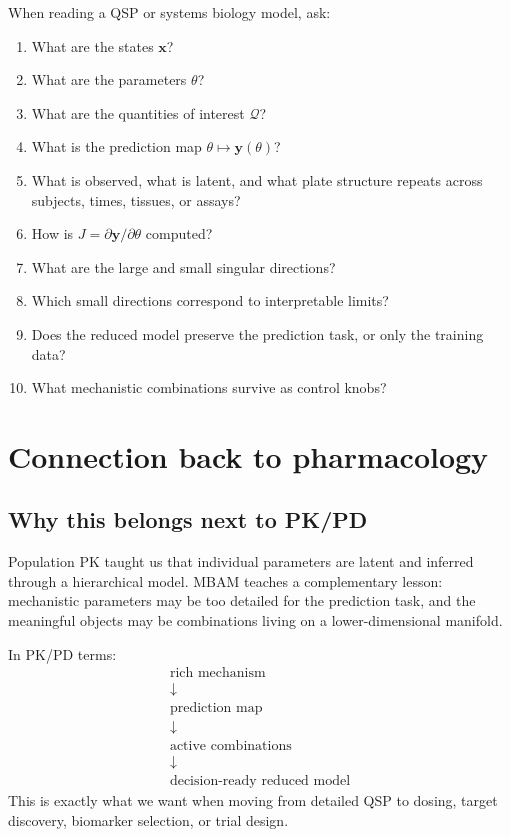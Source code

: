 \documentclass[a4paper]{article}
\newcommand{\vect}[1]{\mathbf{#1}}
\newcommand{\param}{\theta}
\newcommand{\qoi}{\mathcal{Q}}
\newcommand{\jac}{J}
\begin{document}
When reading a QSP or systems biology model, ask:
\begin{enumerate}[leftmargin=2em]
  \item What are the states \(\vect{x}\)?
  \item What are the parameters \(\param\)?
  \item What are the quantities of interest \(\qoi\)?
  \item What is the prediction map \(\param\mapsto\vect{y}(\param)\)?
  \item What is observed, what is latent, and what plate structure repeats across subjects, times, tissues, or assays?
  \item How is \(\jac=\partial\vect{y}/\partial\param\) computed?
  \item What are the large and small singular directions?
  \item Which small directions correspond to interpretable limits?
  \item Does the reduced model preserve the prediction task, or only the training data?
  \item What mechanistic combinations survive as control knobs?
\end{enumerate}

\section{Connection back to pharmacology}

\subsection{Why this belongs next to PK/PD}

Population PK taught us that individual parameters are latent and inferred through a hierarchical model.  MBAM teaches a complementary lesson: mechanistic parameters may be too detailed for the prediction task, and the meaningful objects may be combinations living on a lower-dimensional manifold.

In PK/PD terms:
\[
  \begin{array}{c}
    \text{rich mechanism}\\
    \downarrow\\
    \text{prediction map}\\
    \downarrow\\
    \text{active combinations}\\
    \downarrow\\
    \text{decision-ready reduced model}
  \end{array}
\]
This is exactly what we want when moving from detailed QSP to dosing, target discovery, biomarker selection, or trial design.
\end{document}
